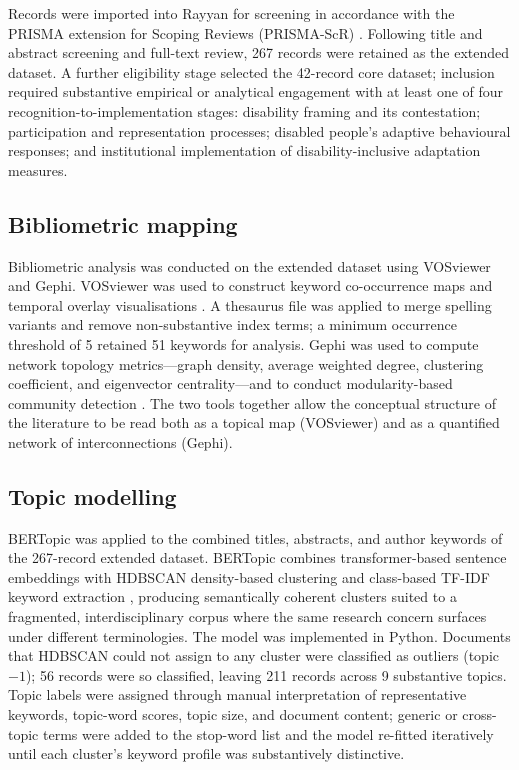 \documentclass[12pt,a4paper]{article}
\begin{document}
Records were imported into Rayyan for screening in accordance with the PRISMA extension for Scoping Reviews (PRISMA-ScR) \cite{tricco2018prisma}. Following title and abstract screening and full-text review, 267 records were retained as the extended dataset. A further eligibility stage selected the 42-record core dataset; inclusion required substantive empirical or analytical engagement with at least one of four recognition-to-implementation stages: disability framing and its contestation; participation and representation processes; disabled people's adaptive behavioural responses; and institutional implementation of disability-inclusive adaptation measures.

\subsection*{Bibliometric mapping}

Bibliometric analysis was conducted on the extended dataset using VOSviewer and Gephi. VOSviewer was used to construct keyword co-occurrence maps and temporal overlay visualisations \cite{van_eck_waltman_2010_vosviewer,van_eck_waltman_2014_visualizing}. A thesaurus file was applied to merge spelling variants and remove non-substantive index terms; a minimum occurrence threshold of 5 retained 51 keywords for analysis. Gephi was used to compute network topology metrics---graph density, average weighted degree, clustering coefficient, and eigenvector centrality---and to conduct modularity-based community detection \cite{newman_2006_modularity}. The two tools together allow the conceptual structure of the literature to be read both as a topical map (VOSviewer) and as a quantified network of interconnections (Gephi).

\subsection*{Topic modelling}

BERTopic was applied to the combined titles, abstracts, and author keywords of the 267-record extended dataset. BERTopic combines transformer-based sentence embeddings with HDBSCAN density-based clustering and class-based TF-IDF keyword extraction \cite{grootendorst_2022_bertopic}, producing semantically coherent clusters suited to a fragmented, interdisciplinary corpus where the same research concern surfaces under different terminologies. The model was implemented in Python. Documents that HDBSCAN could not assign to any cluster were classified as outliers (topic $-1$); 56 records were so classified, leaving 211 records across 9 substantive topics. Topic labels were assigned through manual interpretation of representative keywords, topic-word scores, topic size, and document content; generic or cross-topic terms were added to the stop-word list and the model re-fitted iteratively until each cluster's keyword profile was substantively distinctive.
\end{document}
